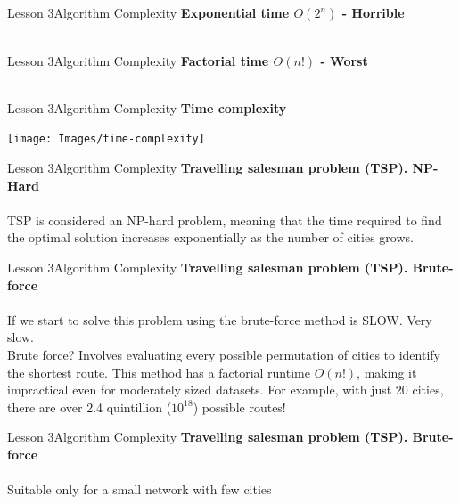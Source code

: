 \documentclass[aspectratio=1610]{beamer}
\begin{document}
\begin{frame}{Lesson 3}{Algorithm Complexity}
\LARGE
\textbf{Exponential time $O(2^n)$ - Horrible}\\~\\
\end{frame}


\begin{frame}{Lesson 3}{Algorithm Complexity}
\LARGE
\textbf{Factorial time $O(n!)$ - Worst}\\~\\
\end{frame}



\begin{frame}{Lesson 3}{Algorithm Complexity}
\LARGE
\textbf{Time complexity}\\
\begin{center}
\texttt{[image: Images/time-complexity]}
\end{center}
\end{frame}


\begin{frame}{Lesson 3}{Algorithm Complexity}
\LARGE
\textbf{Travelling salesman problem (TSP). NP-Hard}\\~\\
TSP is considered an NP-hard problem, meaning that the time required to find the
optimal solution increases exponentially as the number of cities grows.
\end{frame}




\begin{frame}{Lesson 3}{Algorithm Complexity}
\LARGE
\textbf{Travelling salesman problem (TSP). Brute-force}\\~\\
If we start to solve this problem using the brute-force method is SLOW. 
Very slow.\\
\Large
Brute force? Involves evaluating every possible permutation of cities to identify
the shortest route. This method has a factorial runtime $O(n!)$, making it 
impractical even for moderately sized datasets. For example, with just 20 cities,
there are over 2.4 quintillion ($10^18$) possible routes!
\end{frame}


\begin{frame}{Lesson 3}{Algorithm Complexity}
\LARGE
\textbf{Travelling salesman problem (TSP). Brute-force}\\~\\
Suitable only for a small network with few cities
\end{frame}
\end{document}
